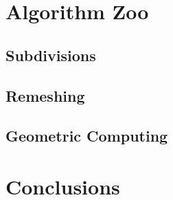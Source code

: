 \documentclass{egpubl}
\begin{document}
\section{Algorithm Zoo}

  \subsection{Subdivisions}
  

  \subsection{Remeshing}
  

  \subsection{Geometric Computing}
  

\section{Conclusions}




\end{document}
